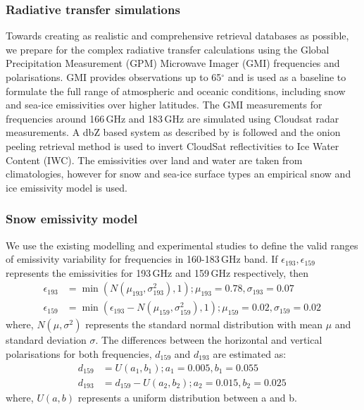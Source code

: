 \documentclass[12pt,oneside,a4paper]{article}
\begin{document}
\subsubsection{Radiative transfer simulations}
%
\label{sec:radiative_transfer}
Towards creating as realistic and comprehensive retrieval databases as possible, we prepare for the complex radiative transfer calculations using the Global Precipitation Measurement (GPM) Microwave Imager (GMI) frequencies and polarisations. GMI provides observations up to 65$^{\circ}$ and is used as a baseline to formulate the full range of atmospheric and oceanic conditions, including snow and sea-ice emissivities over higher latitudes. The GMI measurements for frequencies around 166\,GHz and 183\,GHz are simulated using Cloudsat radar measurements. A dbZ based system as described by \citet{ekelund:using:20} is followed and the onion peeling retrieval method is used to invert CloudSat reflectivities to Ice Water Content (IWC). The emissivities over land and water are taken from climatologies, however for snow and sea-ice surface types an empirical snow and ice emissivity model is used.

\subsubsection*{Snow emissivity model}
%
We use the existing modelling and experimental studies\citep{harlow:2009:milli, harlow:2012:tundr,hewison:2002:airbo} to define the valid ranges of emissivity variability for frequencies in 160-183\,GHz band. If $\epsilon_{193}, \epsilon_{159}$ represents the emissivities for 193\,GHz and 159\,GHz respectively, then
\begin{align}
\epsilon_{193}& = \min({N(\mu_{193}, \sigma_{193}^{2}), 1}) ; \mu_{193} = 0.78, \sigma_{193} = 0.07 \\
\epsilon_{159}& = \min(\epsilon_{193} - N(\mu_{159}, \sigma_{159}^{2}), 1) ;  \mu_{159} = 0.02, \sigma_{159} = 0.02\,
\end{align}
where, $N(\mu, \sigma^{2})$ represents the standard normal distribution with mean $\mu$ and standard deviation $\sigma$. The differences between the horizontal and vertical polarisations for both frequencies, $d_{159}$ and $d_{193}$ are estimated as:
\begin{align}
d_{159}& = U(a_1, b_1) ; a_1 = 0.005, b_1 = 0.055\\
d_{193}& = d_{159} - U(a_2, b_2) ; a_2 = 0.015, b_2 = 0.025 \,
\end{align}
where, $U(a, b)$ represents a uniform distribution between a and b. 
\end{document}
